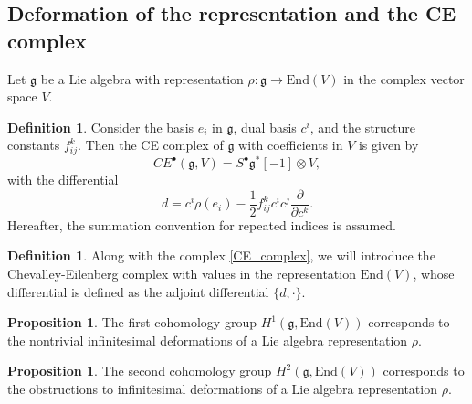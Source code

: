 \documentclass[10pt,a4paper]{amsart}
\theoremstyle{definition}
\newtheorem{proposition}[remark]{Proposition}
\newtheorem{definition}[remark]{Definition}
\begin{document}
\subsection{Deformation of the representation and the CE complex}
Let $\mathfrak{g}$ be a Lie algebra with representation $\rho: \mathfrak{g}\rightarrow \mathrm{End}(V)$ in the complex vector space $V$.
\begin{definition}
    Consider the basis $e_i$ in $\mathfrak{g}$, dual basis $c^i$, and the structure constants $f_{ij}^k$. Then the CE complex of $\mathfrak{g}$ with coefficients in $V$ is given by
    \begin{equation}
        \label{CE_complex}
        CE^{\bullet}(\mathfrak{g},V) = S^{\bullet}\mathfrak{g}^*[-1]\otimes V,
    \end{equation}
    with the differential
    \begin{equation}
    \label{CE_diff}
        d =c^i\rho(e_i)-\frac{1}{2}f_{ij}^k c^i c^j\frac{\partial}{\partial c^k}.
    \end{equation}
    Hereafter, the summation convention for repeated indices is assumed.
\end{definition}
\begin{definition}
    Along with the complex \eqref{CE_complex}, we will introduce the Chevalley-Eilenberg complex with values in the representation $\mathrm{End}(V)$, whose differential is defined as the adjoint differential $\{d,\cdot \}$.
\end{definition}
\begin{proposition} \label{prop:first-h}
    The first cohomology group $H^1(\mathfrak{g},\mathrm{End}(V))$ corresponds to the nontrivial infinitesimal deformations of a Lie algebra representation $\rho$.
\end{proposition}
\begin{proposition} \label{prop:second-h}
    The second cohomology group $H^2(\mathfrak{g},\mathrm{End}(V))$ corresponds to the obstructions to  infinitesimal deformations of a Lie algebra representation $\rho$.
\end{proposition}
\end{document}
